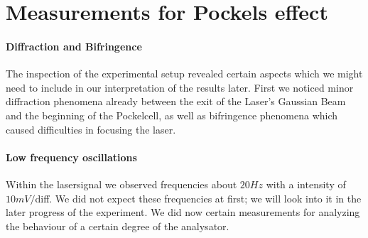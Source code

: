 \newcommand{\figdirpockels}{analysis_pockels/figures/}

\section{Measurements for Pockels effect}
\paragraph{Diffraction and Bifringence}
The inspection of the experimental setup revealed certain aspects
which we might need to include in our interpretation of the results
later. First we noticed minor diffraction phenomena already between
the exit of the Laser's Gaussian Beam and the beginning of the
Pockelcell, as well as bifringence phenomena which caused difficulties
in focusing the laser.  
\paragraph{Low frequency oscillations} Within the lasersignal 
we observed frequencies about $20 Hz$ with a intensity of $10mV/$diff.
We did not expect these frequencies at first; we will look into it
in the later progress of the experiment.
We did now certain measurements for analyzing the behaviour of a 
certain degree of the analysator.

